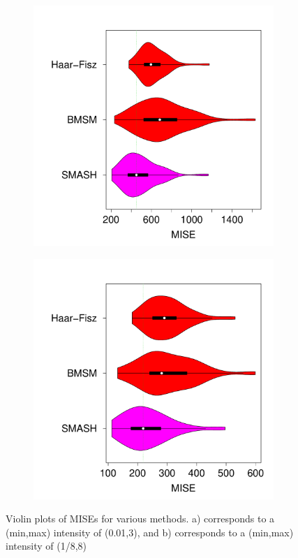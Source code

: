 \documentclass[12pt]{article}
\begin{document}
\begin{figure}
\centering
    \begin{subfigure}[b]{0.45\textwidth}
        \centering
        \includegraphics[width=\textwidth]{violin_pois_1.pdf}
        \caption{}
        \label{fig:pois_1}
    \end{subfigure}
		\hfill
    \begin{subfigure}[b]{0.45\textwidth}
        \centering
        \includegraphics[width=\textwidth]{violin_pois_8.pdf}
        \caption{}
        \label{fig:pois_8}
    \end{subfigure}
    \caption{Violin plots of MISEs for various methods. a) corresponds to a (min,max) intensity of (0.01,3), and b) corresponds to a (min,max) intensity of (1/8,8)}
    \label{fig:pois_sim}
\end{figure}
\end{document}
